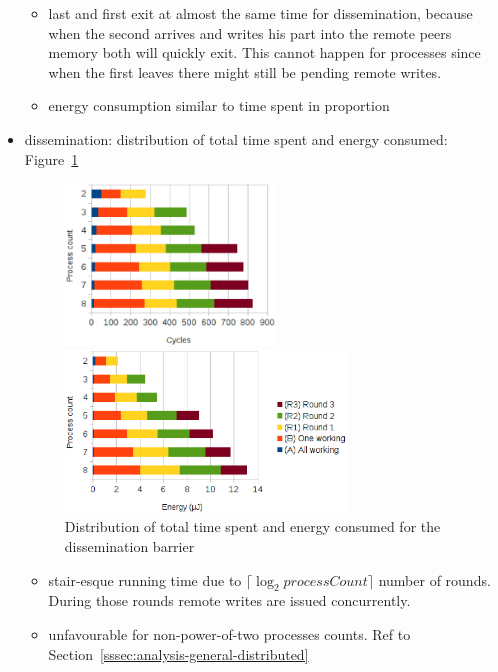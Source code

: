 \documentclass[a4paper, 10pt]{article}
\begin{document}
\begin{itemize}
\begin{itemize}
			\item last and first exit at almost the same time for dissemination, because when the second arrives and writes his part into the remote peers memory both will quickly exit. This cannot happen for processes since when the first leaves there might still be pending remote writes.
			\item energy consumption similar to time spent in proportion
		\end{itemize}
	\item dissemination: distribution of total time spent and energy consumed: Figure~\ref{fig:d-work-100-partition}
		\begin{figure}[htbp]
			\centering
			\begin{minipage}[b]{0.42\linewidth}
				\includegraphics[height=4.3cm]{charts/d-time-work-100-partition}
			\end{minipage}
			\begin{minipage}[b]{0.54\linewidth}
				\includegraphics[height=4.3cm]{charts/d-energy-work-100-partition}
			\end{minipage}
			\caption{Distribution of total time spent and energy consumed for the dissemination barrier}
			\label{fig:d-work-100-partition}
		\end{figure}
		\begin{itemize}
			\item stair-esque running time due to $\lceil \log_2 \mathit{processCount} \rceil$ number of rounds. During those rounds remote writes are issued concurrently.
			\item unfavourable for non-power-of-two processes counts. Ref to Section~\ref{sssec:analysis-general-distributed}

\end{itemize}
\end{itemize}
\end{document}
